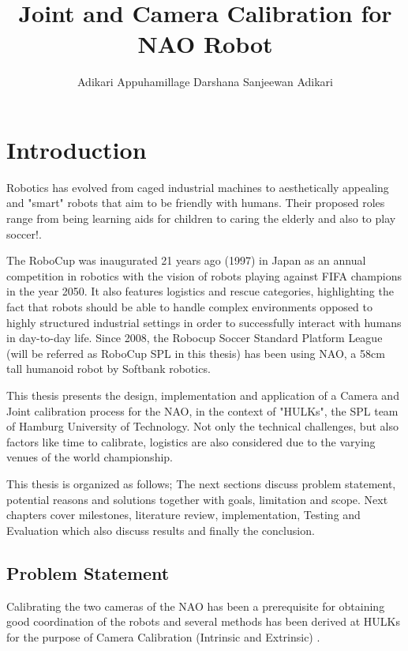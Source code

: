 \documentclass[english, printversion, nomenclature, notitle]{tuvisionthesis} %
\author{Adikari Appuhamillage Darshana Sanjeewan Adikari}
\title{Joint and Camera Calibration for NAO Robot}
\begin{document}
\hypersetup{
	pdfauthor=\@author\relax,
	pdftitle=\@title\relax
}
\tuvisionheading
\hypersetup{pageanchor=true}
\clearpage{\thispagestyle{empty}\cleardoublepage}

\chapter{Introduction}

Robotics has evolved from caged industrial machines to aesthetically appealing and "smart" robots that aim to be friendly with humans. Their proposed roles range from being learning aids for children to caring the elderly and also to play soccer!.

The RoboCup was inaugurated 21 years ago (1997) in Japan as an annual competition in robotics with the vision of robots playing against FIFA champions in the year 2050. It also features  logistics and rescue categories, highlighting  the fact that robots should be able to handle complex environments opposed to highly structured industrial settings in order to successfully interact with humans in day-to-day life.  Since 2008, the Robocup Soccer Standard Platform League (will be referred as RoboCup SPL in this thesis) has been using NAO, a 58cm tall humanoid robot by Softbank robotics.

This thesis presents the design, implementation and application of a Camera and Joint calibration process for the NAO, in the context of "HULKs", the SPL team of Hamburg University of Technology. Not only the technical challenges, but also factors like time to calibrate, logistics are also considered due to the varying venues of the world championship.

This thesis is organized as follows; The next sections discuss problem statement, potential reasons and solutions together with goals, limitation and scope. Next chapters cover milestones, literature review, implementation, Testing and Evaluation which also discuss results and finally the conclusion.

\section{Problem Statement}

Calibrating the two cameras of the NAO has been a prerequisite for obtaining good coordination of the robots and several methods has been derived at HULKs for the purpose of Camera Calibration (Intrinsic and Extrinsic) \cite{darshana_adikari_team_2017}.
\end{document}
